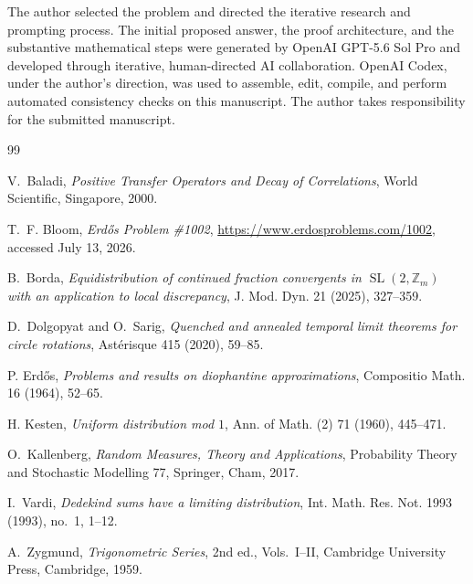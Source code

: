 \documentclass[11pt,a4paper]{amsart}
\theoremstyle{definition}
\theoremstyle{remark}
\begin{document}
The author selected the problem and directed the iterative research and
prompting process.  The initial proposed answer, the proof architecture, and
the substantive mathematical steps were generated by OpenAI GPT-5.6 Sol Pro
and developed through iterative, human-directed AI collaboration.  OpenAI
Codex, under the author's direction, was used to assemble, edit, compile, and
perform automated consistency checks on this manuscript.  The author takes
responsibility for the submitted manuscript.

\begin{thebibliography}{99}

V.~Baladi,
\emph{Positive Transfer Operators and Decay of Correlations},
World Scientific, Singapore, 2000.

T.~F. Bloom,
\emph{Erd\H{o}s Problem \#1002},
\url{https://www.erdosproblems.com/1002}, accessed July 13, 2026.

B.~Borda,
\emph{Equidistribution of continued fraction convergents in
$\operatorname{SL}(2,\mathbb Z_m)$ with an application to local discrepancy},
J. Mod. Dyn. 21 (2025), 327--359.

D.~Dolgopyat and O.~Sarig,
\emph{Quenched and annealed temporal limit theorems for circle rotations},
Ast\'erisque 415 (2020), 59--85.

P. Erd\H{o}s,
\emph{Problems and results on diophantine approximations},
Compositio Math. 16 (1964), 52--65.

H. Kesten,
\emph{Uniform distribution mod $1$},
Ann. of Math. (2) 71 (1960), 445--471.

O.~Kallenberg,
\emph{Random Measures, Theory and Applications},
Probability Theory and Stochastic Modelling 77,
Springer, Cham, 2017.

I.~Vardi,
\emph{Dedekind sums have a limiting distribution},
Int. Math. Res. Not. 1993 (1993), no.~1, 1--12.

A.~Zygmund,
\emph{Trigonometric Series}, 2nd ed., Vols.~I--II,
Cambridge University Press, Cambridge, 1959.

\end{thebibliography}
\end{document}
